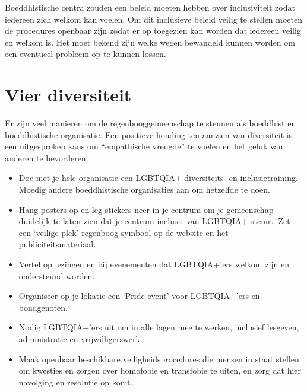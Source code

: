 \documentclass[12pt,openany]{book}
\begin{document}
Boeddhistische centra zouden een beleid moeten hebben over inclusiviteit zodat iedereen zich welkom kan voelen. Om dit inclusieve beleid veilig te stellen moeten de procedures openbaar zijn zodat er op toegezien kan worden dat iedereen veilig en welkom is. Het moet bekend zijn welke wegen bewandeld kunnen worden om een eventueel probleem op te kunnen lossen.

\section*{Vier diversiteit} 

Er zijn veel manieren om de regenbooggemeenschap te steunen als boeddhist en boeddhistische organisatie. Een positieve houding ten aanzien van diversiteit is een uitgesproken kans om “empathische vreugde” te voelen en het geluk van anderen te bevorderen.

\begin{itemize}
  \setlength\itemsep{0em}
  \item Doe met je hele organisatie een LGBTQIA+ diversiteits- en inclusietraining. Moedig andere boeddhistische organisaties aan om hetzelfde te doen.
  \item Hang posters op en leg stickers neer in je centrum om je gemeenschap duidelijk te laten zien dat je centrum inclusie van LGBTQIA+ steunt. Zet een ‘veilige plek’-regenboog symbool op de website en het publiciteitsmateriaal.
  \item Vertel op lezingen en bij evenementen dat LGBTQIA+’ers welkom zijn en ondersteund worden.
  \item Organiseer op je lokatie een ‘Pride-event’ voor LGBTQIA+’ers en bondgenoten.
  \item Nodig LGBTQIA+’ers uit om in alle lagen mee te werken, inclusief lesgeven, administratie en vrijwilligerswerk.
  \item Maak openbaar beschikbare veiligheidsprocedures die mensen in staat stellen om kwesties en zorgen over homofobie en transfobie te uiten, en zorg dat hier navolging en resolutie op komt.
\end{itemize}

\begin{figure}[h]
    \centering
\end{figure}
\end{document}
